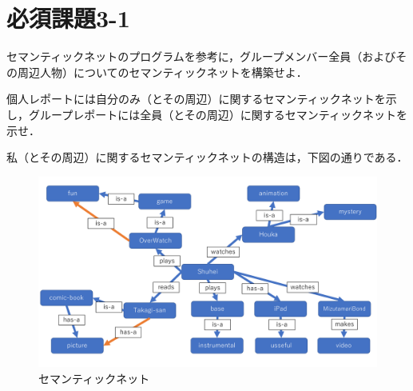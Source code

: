 \documentclass[12pt]{jarticle}
\begin{document}
\clearpage

\section{必須課題3-1}
\begin{screen}
セマンティックネットのプログラムを参考に，グループメンバー全員（およびその周辺人物）についてのセマンティックネットを構築せよ．

個人レポートには自分のみ（とその周辺）に関するセマンティックネットを示し，グループレポートには全員（とその周辺）に関するセマンティックネットを示せ．
\end{screen}
私（とその周辺）に関するセマンティックネットの構造は，下図の通りである．
\begin{figure}[!hbt]
  	\begin{center}
  	\includegraphics[scale=0.40]{images/aoyama_semantic_net.pdf}
	\end{center}
  	\caption{セマンティックネット}
\end{figure}

\clearpage
\end{document}
